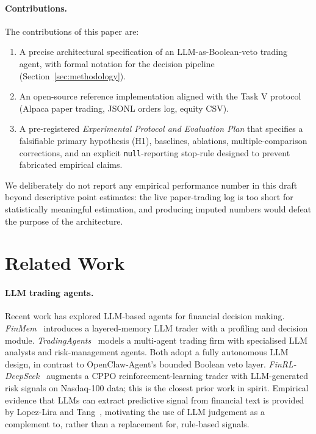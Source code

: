 \documentclass{article}
\begin{document}
\paragraph{Contributions.} The contributions of this paper are:
\begin{enumerate}
  \item A precise architectural specification of an LLM-as-Boolean-veto trading agent, with formal notation for the decision pipeline (Section~\ref{sec:methodology}).
  \item An open-source reference implementation aligned with the Task V protocol (Alpaca paper trading, JSONL orders log, equity CSV).
  \item A pre-registered \emph{Experimental Protocol and Evaluation Plan} that specifies a falsifiable primary hypothesis (H1), baselines, ablations, multiple-comparison corrections, and an explicit \texttt{null}-reporting stop-rule designed to prevent fabricated empirical claims.
\end{enumerate}
We deliberately do not report any empirical performance number in this draft beyond descriptive point estimates: the live paper-trading log is too short for statistically meaningful estimation, and producing imputed numbers would defeat the purpose of the architecture.

\section{Related Work}
\paragraph{LLM trading agents.} Recent work has explored LLM-based agents for financial decision making. \emph{FinMem}~\cite{finmem_yu2023} introduces a layered-memory LLM trader with a profiling and decision module. \emph{TradingAgents}~\cite{tradingagents_xiao2024} models a multi-agent trading firm with specialised LLM analysts and risk-management agents. Both adopt a fully autonomous LLM design, in contrast to OpenClaw-Agent\textquoteright s bounded Boolean veto layer. \emph{FinRL-DeepSeek}~\cite{finrl_deepseek} augments a CPPO reinforcement-learning trader with LLM-generated risk signals on Nasdaq-100 data; this is the closest prior work in spirit. Empirical evidence that LLMs can extract predictive signal from financial text is provided by Lopez-Lira and Tang~\cite{lopezlira_tang2023}, motivating the use of LLM judgement as a complement to, rather than a replacement for, rule-based signals.
\end{document}
